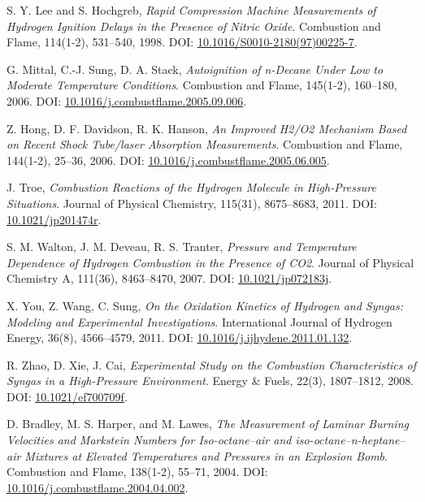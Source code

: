\documentclass[12pt]{report}
\begin{document}
\begin{thebibliography}{9}
S. Y. Lee and S. Hochgreb,
\textit{Rapid Compression Machine Measurements of Hydrogen Ignition Delays in the Presence of Nitric Oxide}. 
Combustion and Flame, 114(1-2), 531--540, 1998. DOI: \href{https://doi.org/10.1016/S0010-2180(97)00225-7}{10.1016/S0010-2180(97)00225-7}.

G. Mittal, C.-J. Sung, D. A. Stack, 
\textit{Autoignition of n-Decane Under Low to Moderate Temperature Conditions}. 
Combustion and Flame, 145(1-2), 160--180, 2006. DOI: \href{https://doi.org/10.1016/j.combustflame.2005.09.006}{10.1016/j.combustflame.2005.09.006}.

Z. Hong, D. F. Davidson, R. K. Hanson,
\textit{An Improved H2/O2 Mechanism Based on Recent Shock Tube/laser Absorption Measurements}. 
Combustion and Flame, 144(1-2), 25--36, 2006. DOI: \href{https://doi.org/10.1016/j.combustflame.2005.06.005}{10.1016/j.combustflame.2005.06.005}.

J. Troe,
\textit{Combustion Reactions of the Hydrogen Molecule in High-Pressure Situations}. 
Journal of Physical Chemistry, 115(31), 8675--8683, 2011. DOI: \href{https://doi.org/10.1021/jp201474r}{10.1021/jp201474r}.

S. M. Walton, J. M. Deveau, R. S. Tranter, 
\textit{Pressure and Temperature Dependence of Hydrogen Combustion in the Presence of CO2}. 
Journal of Physical Chemistry A, 111(36), 8463--8470, 2007. DOI: \href{https://doi.org/10.1021/jp072183j}{10.1021/jp072183j}.

X. You, Z. Wang, C. Sung,
\textit{On the Oxidation Kinetics of Hydrogen and Syngas: Modeling and Experimental Investigations}. 
International Journal of Hydrogen Energy, 36(8), 4566--4579, 2011. DOI: \href{https://doi.org/10.1016/j.ijhydene.2011.01.132}{10.1016/j.ijhydene.2011.01.132}.

R. Zhao, D. Xie, J. Cai,
\textit{Experimental Study on the Combustion Characteristics of Syngas in a High-Pressure Environment}. 
Energy & Fuels, 22(3), 1807--1812, 2008. DOI: \href{https://doi.org/10.1021/ef700709f}{10.1021/ef700709f}.

D. Bradley, M. S. Harper, and M. Lawes,
\textit{The Measurement of Laminar Burning Velocities and Markstein Numbers for Iso-octane–air and iso-octane–n-heptane–air Mixtures at Elevated Temperatures and Pressures in an Explosion Bomb}. 
Combustion and Flame, 138(1-2), 55--71, 2004. DOI: \href{https://doi.org/10.1016/j.combustflame.2004.04.002}{10.1016/j.combustflame.2004.04.002}.


\end{thebibliography}
\end{document}
